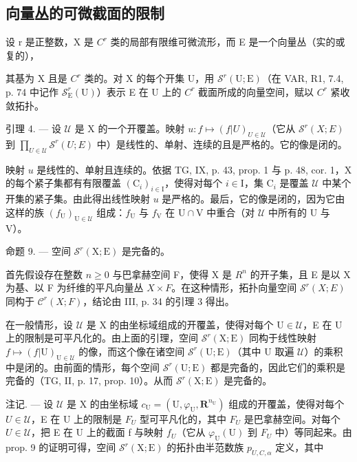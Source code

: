 \subsection{向量丛的可微截面的限制}

设 r 是正整数，X 是 \(C^{r}\) 类的局部有限维可微流形，而 E 是一个向量丛（实的或复的），

其基为 X 且是 \(C^{r}\) 类的。对 X 的每个开集 U，用 \(\mathcal{S}^{r}(\mathrm{U};\mathrm{E})\)（在 VAR, R1, 7.4, p. 74 中记作 \(\mathcal{S}_{\mathrm{E}}^{r}(\mathrm{U})\)）表示 E 在 U 上的 \(C^{r}\) 截面所成的向量空间，赋以 \(C^{r}\) 紧收敛拓扑。

引理 4. --- 设 \(\mathcal{U}\) 是 X 的一个开覆盖。映射 \(u: f \mapsto (f|U)_{U \in \mathcal{U}}\)（它从 \(\mathcal{S}^{r}(X;E)\) 到 \(\prod_{U \in \mathcal{U}} \mathcal{S}^{r}(U;E)\) 中）是线性的、单射、连续的且是严格的。它的像是闭的。

映射 \(u\) 是线性的、单射且连续的。依据 TG, IX, p. 43, prop. 1 与 p. 48, cor. 1，X 的每个紧子集都有有限覆盖 \((\mathrm{C}_i)_{i\in \mathrm{I}}\)，使得对每个 \(i\in \mathrm{I}\)，集 \(\mathrm{C}_i\) 是覆盖 \(\mathcal{U}\) 中某个开集的紧子集。由此得出线性映射 \(u\) 是严格的。最后，它的像是闭的，因为它由这样的族 \((f_{\mathrm{U}})_{\mathrm{U}\in \mathcal{U}}\) 组成：\(f_{\mathrm{U}}\) 与 \(f_{\mathrm{V}}\) 在 \(\mathrm{U}\cap \mathrm{V}\) 中重合（对 \(\mathcal{U}\) 中所有的 U 与 V）。

命题 9. --- 空间 \(\mathcal{S}^r(\mathrm{X};\mathrm{E})\) 是完备的。

首先假设存在整数 \(n \geqslant 0\) 与巴拿赫空间 F，使得 X 是 \(R^{n}\) 的开子集，且 E 是以 X 为基、以 F 为纤维的平凡向量丛 \(X \times F\)。在这种情形，拓扑向量空间 \(\mathcal{S}^{r}(X;E)\) 同构于 \(\mathcal{C}^{r}(X;F)\)，结论由 III, p. 34 的引理 3 得出。

在一般情形，设 \(\mathcal{U}\) 是 X 的由坐标域组成的开覆盖，使得对每个 \(\mathrm{U} \in \mathcal{U}\)，E 在 U 上的限制是可平凡化的。由上面的引理，空间 \(\mathcal{S}^r(\mathrm{X};\mathrm{E})\) 同构于线性映射 \(f \mapsto (f|\mathrm{U})_{\mathrm{U} \in \mathcal{U}}\) 的像，而这个像在诸空间 \(\mathcal{S}^r(\mathrm{U};\mathrm{E})\)（其中 U 取遍 \(\mathcal{U}\)）的乘积中是闭的。由前面的情形，每个空间 \(\mathcal{S}^r(\mathrm{U};\mathrm{E})\) 都是完备的，因此它们的乘积是完备的（TG, II, p. 17, prop. 10）。从而 \(\mathcal{S}^r(\mathrm{X};\mathrm{E})\) 是完备的。

注记. --- 设 \(\mathcal{U}\) 是 X 的由坐标域 \(c_{\mathrm{U}} = (\mathrm{U}, \varphi_{\mathrm{U}}, \mathbf{R}^{n_{\mathrm{U}}})\) 组成的开覆盖，使得对每个 \(U \in \mathcal{U}\)，E 在 U 上的限制是 \(F_{U}\) 型可平凡化的，其中 \(F_{U}\) 是巴拿赫空间。对每个 \(U \in \mathcal{U}\)，把 E 在 U 上的截面 f 与映射 \(f_{U}\)（它从 \(\varphi_{\mathrm{U}}(\mathrm{U})\) 到 \(F_{U}\) 中）等同起来。由 prop. 9 的证明可得，空间 \(\mathcal{S}^{r}(\mathrm{X};\mathrm{E})\) 的拓扑由半范数族 \(p_{U,C,\alpha}\) 定义，其中

